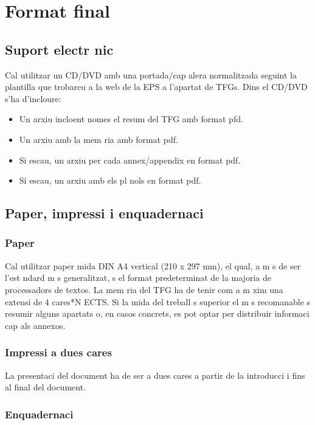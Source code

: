 
\chapter{Format final}

\section{Suport electr nic}
Cal utilitzar un CD/DVD amb una portada/cap alera normalitzada seguint la plantilla que trobareu a la web de la EPS a l'apartat de TFGs. Dins el CD/DVD s'ha d'incloure:
\begin{itemize}
  \item Un arxiu incloent nomes el resum del TFG amb format pfd.
  \item Un arxiu amb la mem ria amb format pdf.
  \item Si escau, un arxiu per cada annex/appendix en format pdf.
  \item Si escau, un arxiu amb els pl nols en format pdf.
\end{itemize}

\section{Paper, impressi  i enquadernaci }

\subsection{Paper}

Cal utilitzar paper mida DIN A4 vertical (210 x 297 mm), el qual, a m s de ser l'est ndard m s generalitzat,  s el format predeterminat de
la majoria de processadors de textos. La mem ria del TFG ha de tenir com a m xim una extensi  de 4 cares*N ECTS. Si la mida del treball  s superior el m s recomanable  s resumir alguns apartats o, en casos concrets, es pot optar per distribuir informaci  cap als annexos. 

\subsection{Impressi  a dues cares}

La presentaci  del document ha de ser a dues cares a partir de la introducci  i fins al final del document. 
\subsection{Enquadernaci }


